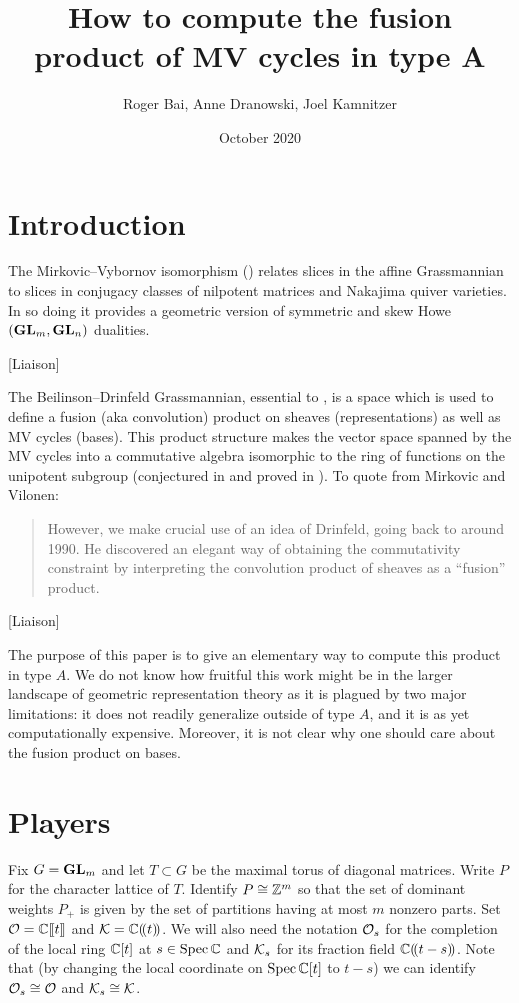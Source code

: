 \documentclass{article}
\title{How to compute the fusion product of MV cycles in type A}
\author{Roger Bai, Anne Dranowski, Joel Kamnitzer}
\date{October 2020}
\begin{document}
\maketitle

\section{Introduction}
% 
The Mirkovic--Vybornov isomorphism (\cite{mirkovic2007quiver,mirkovic2019comparison}) relates slices in the affine Grassmannian to slices in conjugacy classes of nilpotent matrices and Nakajima quiver varieties. In so doing it provides a geometric version of symmetric and skew Howe $(\GL_m,\GL_n)$ dualities. 
% 

[Liaison]

The Beilinson--Drinfeld Grassmannian, essential to \cite{mirkovic2007geometric}, is a space which is used to define a fusion (aka convolution) product on sheaves (representations) as well as MV cycles (bases). 
% 
This product structure makes the vector space spanned by the MV cycles into a commutative algebra isomorphic to the ring of functions on the unipotent subgroup (conjectured in \cite{anderson2003polytope} and proved in \cite{baumann2019mirkovic}). %
% 
To quote from Mirkovic and Vilonen:
\begin{quotation}
    However, we make crucial use of an idea of Drinfeld, going back to around 1990. He discovered an elegant way of obtaining the commutativity constraint by interpreting the convolution product of sheaves as a ``fusion'' product.
\end{quotation}
% 
[Liaison]

The purpose of this paper is to give an elementary way to compute this product in type $A$. We do not know how fruitful this work might be in the larger landscape of geometric representation theory as it is plagued by two major limitations: it does not readily generalize outside of type $A$, and it is as yet computationally expensive. 
% 
Moreover, it is not clear why one should care about the fusion product on bases.     

\section{Players}

Fix $G = \GL_m$ and let $T\subset G$ be the maximal torus of diagonal matrices. 
Write $P$ for the character lattice of $T$. Identify $P\cong \ZZ^m$ so that the set of dominant weights $P_+$ is given by the set of partitions having at most $m$ nonzero parts. Set $\cO = \CC\xt$ and $\cK = \CC\xT$. We will also need the notation $\cO_s$ for the completion of the local ring $\CC[t]$ at $s\in\spec\CC$ and $\cK_s$ for its fraction field $\CC\xT[t-s]$. 
% 
Note that (by changing the local coordinate on $\spec\CC[t]$ to $t-s$) we can identify $\cO_s \cong \cO$ and $\cK_s\cong\cK$. 
\end{document}
